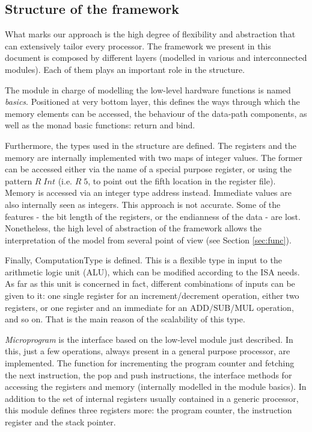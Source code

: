 \documentclass[conference]{IEEEtran}
\begin{document}
\subsection{Structure of the framework}
\label{sec:struct}
What marks our approach is the high degree of flexibility and abstraction that can
extensively tailor every processor. The framework we present in this document is composed
by different layers (modelled in various and interconnected modules). Each of them plays 
an important role in the structure.

The module in charge of modelling the low-level hardware functions is named
\textit{basics}. Positioned at very bottom layer, this defines the ways through which the
memory elements can be accessed, the behaviour of the data-path components, 
as well as the monad basic functions: return and bind.

Furthermore, the types used in the structure are defined.
The registers and the memory are internally implemented with two maps of integer values.
The former can be accessed either via the name of a
special purpose register, or using the pattern $R \; Int$ (i.e. $R \; 5$, to point out the
fifth location in the register file). Memory is accessed via an integer type address instead.
Immediate values are also internally seen as integers. This approach is not
accurate. Some of the features - the bit length of the registers, or the
endianness of the data - are lost. Nonetheless, the high level of abstraction of
the framework allows the interpretation of the model from several point of view (see Section
\ref{sec:func}).

Finally, ComputationType is defined. This is a flexible type in input to the
arithmetic logic unit (ALU), which can be modified according to the ISA
needs. As far as this unit is concerned in fact, different combinations of inputs can be
given to it: one single register for an increment/decrement operation, either two 
registers, or one register and an immediate for an ADD/SUB/MUL operation, and so on.
That is the main reason of the scalability of this type.

\textit{Microprogram} is the interface based on the low-level module just described.
In this, just a few operations, always present in a general purpose processor, are
implemented. The function for incrementing the program counter and fetching
the next instruction, the pop and push instructions, the interface methods for accessing
the registers and memory (internally modelled in the module basics).
In addition to the set of internal registers usually contained in a generic processor,
this module defines three registers more: the program counter, the instruction register and
the stack pointer.
\end{document}
